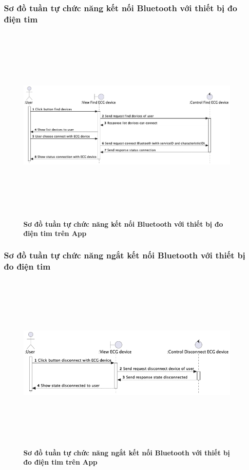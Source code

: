 \documentclass{article}%
\begin{document}
\subsubsection{Sơ đồ tuần tự chức năng kết nối Bluetooth với thiết bị đo điện tim}
  \begin{figure}[H]
        \centering
        \includegraphics[width=16cm,height=10cm]{Images/mobile_app/connect_with_device.png}
        \caption[Sơ đồ tuần tự chức năng kết nối Bluetooth với thiết bị đo điện tim trên App]{\bfseries \fontsize{12pt}{0pt}
        \selectfont Sơ đồ tuần tự chức năng kết nối Bluetooth với thiết bị đo điện tim trên App}
        \label{hinh21} %
  \end{figure}

\subsubsection{Sơ đồ tuần tự chức năng ngắt kết nối Bluetooth với thiết bị đo điện tim}
  \begin{figure}[H]
        \centering
        \includegraphics[width=16cm,height=9cm]{Images/mobile_app/disconnect_with_device.png}
        \caption[Sơ đồ tuần tự chức năng ngắt kết nối Bluetooth với thiết bị đo điện tim trên App]{\bfseries \fontsize{12pt}{0pt}
        \selectfont Sơ đồ tuần tự chức năng ngắt kết nối Bluetooth với thiết bị đo điện tim trên App}
        \label{hinh21} %
  \end{figure}
\end{document}
